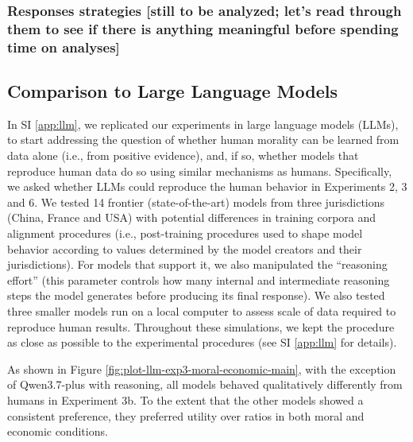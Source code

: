 \documentclass[
]{article}
\begin{document}
\clearpage

\subsubsection{Responses strategies {[}still to be analyzed; let's read through them to see if there is anything meaningful before spending time on analyses{]}}\label{responses-strategies-still-to-be-analyzed-lets-read-through-them-to-see-if-there-is-anything-meaningful-before-spending-time-on-analyses}

\clearpage

\subsection{Comparison to Large Language Models}\label{comparison-to-large-language-models}

In SI \ref{app:llm}, we replicated our experiments in large language models (LLMs), to start addressing the question of whether human morality can be learned from data alone (i.e., from positive evidence), and, if so, whether models that reproduce human data do so using similar mechanisms as humans. Specifically, we asked whether LLMs could reproduce the human behavior in Experiments 2, 3 and 6. We tested 14 frontier (state-of-the-art) models from three jurisdictions (China, France and USA) with potential differences in training corpora and alignment procedures (i.e., post-training procedures used to shape model behavior according to values determined by the model creators and their jurisdictions). For models that support it, we also manipulated the ``reasoning effort'' (this parameter controls how many internal and intermediate reasoning steps the model generates before producing its final response). We also tested three smaller models run on a local computer to assess scale of data required to reproduce human results. Throughout these simulations, we kept the procedure as close as possible to the experimental procedures (see SI \ref{app:llm} for details).

As shown in Figure \ref{fig:plot-llm-exp3-moral-economic-main}, with the exception of Qwen3.7-plus with reasoning, all models behaved qualitatively differently from humans in Experiment 3b. To the extent that the other models showed a consistent preference, they preferred utility over ratios in both moral and economic conditions.
\end{document}
